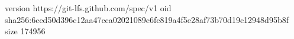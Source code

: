 version https://git-lfs.github.com/spec/v1
oid sha256:6ced50d396c12aa47cca02021089c6fc819a4f5e28af73b70d19c12948d95b8f
size 174956
